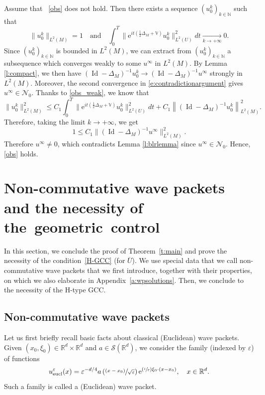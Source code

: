 \documentclass[10pt]{amsart}
\let\mathcal\mathscr
\newcommand{\Psfrac}[2]{(\sfrac{#1}{#2})}
\newcommand{\psfrac}[2]{\sfrac{(#1)}{#2}}
\newcommand{\eucl}{\mathrm{eucl}}
\newcommand{\rme}{\mathrm{e}}
\DeclareMathOperator{\Id}{Id}
\theoremstyle{plain}
\theoremstyle{definition}
\let\eps\varepsilon
\def\R{{\mathbb R}}
\def\N{{\mathbb N}}
\def\bbV{{\mathbb V}}
\newcommand{\Tend}[2]{\mathbin{\mathop{\longrightarrow}\limits_{#1\to#2}}}
\begin{document}
Assume that ~\eqref{obs} does not hold. Then there exists a sequence $(u_0^k)_{k\in\N}$ such that
\begin{equation} \label{e:contradictionargument}
\|u_0^k\|_{L^2(M)}=1\quad \mbox{and}\quad \int_0^T \bigl\| \rme^{it(\frac12 \Delta_M+\bbV)} u_0^k\bigr\|^2_{L^2(U)} dt
\Tend{k}{+\infty} 0.
\end{equation}
Since $(u_0^k)_{k\in\N}$ is bounded in $L^2(M)$, we can extract from $(u_0^k)_{k\in\N}$ a subsequence which converges weakly to some $u^\infty$ in $L^2(M)$. By Lemma \ref{l:compact}, we then have $(\Id-\Delta_M)^{-1}u_0^k\to (\Id-\Delta_M)^{-1}u^\infty$ strongly in $L^2(M)$. Moreover, the second convergence in \eqref{e:contradictionargument} gives $u^\infty\in\mathcal{N}_0$. Thanks to \eqref{obs_weak}, we know that
\begin{equation*}
\|u_0^k\|^2_{L^2(M)} \leq C_1 \int_0^T \bigl\| \rme^{it(\frac12 \Delta_M+\bbV)} u_0^k\bigr\|^2_{L^2(U)} dt
+ C_1 \left\| (\Id-\Delta_M)^{-1} u_0^k\right\|^2_{L^2(M)}.
\end{equation*}
Therefore, taking the limit $k\to +\infty$, we get
\begin{equation*}
1\leq C_1 \| (\Id-\Delta_M)^{-1} u^\infty\|^2_{L^2(M)}.
\end{equation*}
Therefore $u^\infty\neq 0$, which contradicts Lemma \ref{l:blrlemma} since $u^\infty\in\mathcal N_0$. Hence, \eqref{obs} holds.

\section{Non-commutative wave packets and the necessity of the~geometric~control}\label{sec:WP}

In this section, we conclude the proof of Theorem~\ref{t:main} and prove the necessity of the condition~\eqref{H-GCC} (for $\overline{U}$). We use special data that we call non-commutative wave packets that we first introduce, together with their properties, on which we also elaborate in Appendix~\ref{a:wpsolutions}. Then, we conclude to the necessity of the H-type GCC.

\subsection{Non-commutative wave packets} \label{s:WPnoncom}
Let us first briefly recall basic facts about classical (Euclidean) wave packets. Given $(x_0,\xi_0)\in\R^d\times\R^d$ and $a\in\mathcal S(\R^d)$, we consider the family (indexed by $\eps$) of functions
\begin{equation*}%
u_\eucl^\eps(x)= \eps^{-d/4} a\left(\psfrac{x-x_0}{\sqrt\eps}\right) \rme^{\Psfrac i\eps \xi_0\cdot(x-x_0)}, \quad x\in\R^d.
\end{equation*}
Such a family is called a (Euclidean) wave packet.
\end{document}
